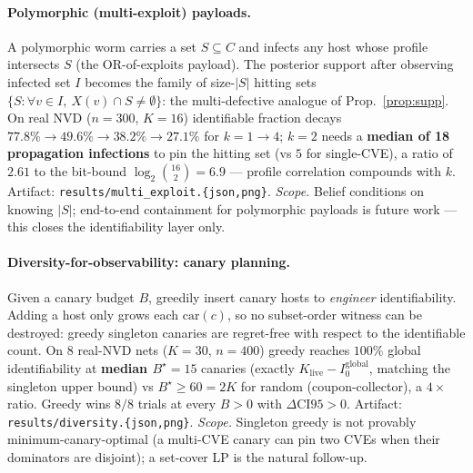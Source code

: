 \documentclass[11pt]{article}
\newcommand{\carriers}{\mathrm{car}}
\begin{document}
\paragraph{Polymorphic (multi-exploit) payloads.}
A polymorphic worm carries a set $S\subseteq C$ and infects any host whose
profile intersects $S$ (the OR-of-exploits payload). The posterior support after
observing infected set $I$ becomes the family of size-$|S|$ hitting sets
$\{S: \forall v\!\in\!I,\ X(v)\cap S\neq\emptyset\}$: the multi-defective
analogue of Prop.~\ref{prop:supp}. On real NVD ($n{=}300$, $K{=}16$)
identifiable fraction decays $77.8\%{\to}49.6\%{\to}38.2\%{\to}27.1\%$ for
$k{=}1{\to}4$; $k{=}2$ needs a \textbf{median of 18 propagation infections} to
pin the hitting set (vs $5$ for single-CVE), a ratio of $2.61$ to the bit-bound
$\log_2\binom{16}{2}\!=\!6.9$ --- profile correlation compounds with $k$.
Artifact: \texttt{results/multi\_exploit.\{json,png\}}. \emph{Scope.} Belief
conditions on knowing $|S|$; end-to-end containment for polymorphic payloads is
future work --- this closes the identifiability layer only.

\paragraph{Diversity-for-observability: canary planning.}
Given a canary budget $B$, greedily insert canary hosts to \emph{engineer}
identifiability. Adding a host only grows each $\carriers(c)$, so no subset-order
witness can be destroyed: greedy singleton canaries are regret-free with respect
to the identifiable count. On $8$ real-NVD nets ($K{=}30$, $n{=}400$) greedy
reaches $100\%$ global identifiability at \textbf{median $B^\star=15$} canaries
(exactly $K_\text{live}-I_0^\text{global}$, matching the singleton upper bound)
vs $B^\star\!\geq\!60=2K$ for random (coupon-collector), a $4\times$ ratio.
Greedy wins $8/8$ trials at every $B>0$ with $\Delta\text{CI95}>0$. Artifact:
\texttt{results/diversity.\{json,png\}}. \emph{Scope.} Singleton greedy is not
provably minimum-canary-optimal (a multi-CVE canary can pin two CVEs when
their dominators are disjoint); a set-cover LP is the natural follow-up.
\end{document}
